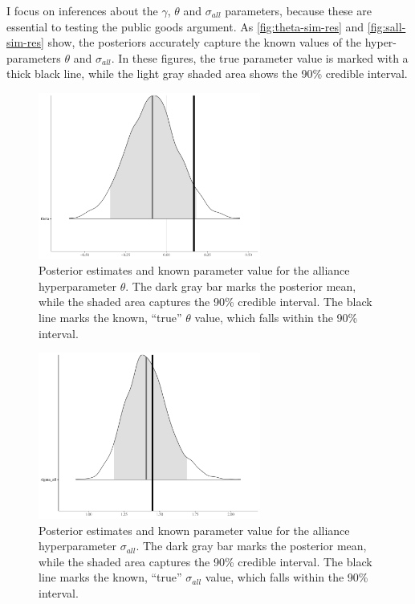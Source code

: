 \documentclass[12pt]{article}
\begin{document}
I focus on inferences about the $\gamma$, $\theta$ and $\sigma_{all}$ parameters, because these are essential to testing the public goods argument. 
As \autoref{fig:theta-sim-res} and \autoref{fig:sall-sim-res} show, the posteriors accurately capture the known values of the hyper-parameters $\theta$ and $\sigma_{all}$. 
In these figures, the true parameter value is marked with a thick black line, while the light gray shaded area shows the 90\% credible interval. 


\begin{figure}[htbp]
	\centering
		\includegraphics[width=0.65\textwidth]{theta-sim-res.pdf}
	\caption{Posterior estimates and known parameter value for the alliance hyperparameter $\theta$. The dark gray bar marks the posterior mean, while the shaded area captures the 90\% credible interval. The black line marks the known, ``true'' $\theta$ value, which falls within the 90\% interval.}
	\label{fig:theta-sim-res}
\end{figure}


\begin{figure}[htbp]
	\centering
		\includegraphics[width=0.65\textwidth]{sall-sim-res.pdf}
	\caption{Posterior estimates and known parameter value for the alliance hyperparameter $\sigma_{all}$. The dark gray bar marks the posterior mean, while the shaded area captures the 90\% credible interval. The black line marks the known, ``true'' $\sigma_{all}$ value, which falls within the 90\% interval.}
	\label{fig:sall-sim-res}
\end{figure}
\end{document}
